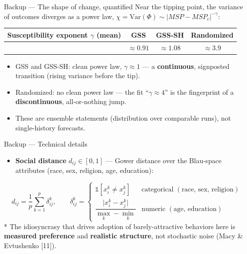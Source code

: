 \documentclass[aspectratio=169,11pt]{beamer}
\newcommand{\refn}[1]{{\color{ndgreen}[#1]}}
\newcommand{\emphr}[1]{{\color{ndreddark}\textbf{#1}}}
\begin{document}
\begin{frame}{Backup — The shape of change, quantified}
\small
Near the tipping point, the variance of outcomes diverges as a power law,
$\chi=\mathrm{Var}(\Phi)\sim|MSP-MSP_c|^{-\gamma}$:
\vspace{0.3cm}
\begin{center}
\renewcommand{\arraystretch}{1.2}
{\normalsize
\begin{tabular}{@{}lccc@{}}
\toprule
Susceptibility exponent $\gamma$ (mean) & \textbf{GSS} & \textbf{GSS-SH} & \textbf{Randomized} \\
\midrule
 & $\approx 0.91$ & $\approx 1.08$ & $\approx 3.9$ \\
\bottomrule
\end{tabular}}
\end{center}
\vspace{0.3cm}
\begin{itemize}
  \item GSS and GSS-SH: clean power law, $\gamma\approx1$ — a \emphr{continuous},
        signposted transition (rising variance before the tip).
  \item Randomized: no clean power law — the fit ``$\gamma\approx4$'' is the
        fingerprint of a \emphr{discontinuous}, all-or-nothing jump.
  \item These are ensemble statements (distribution over comparable runs),
        not single-history forecasts.
\end{itemize}
\end{frame}

\begin{frame}{Backup — Technical details}
\begin{itemize}
  \item \textbf{Social distance} $d_{ij}\in[0,1]$ — Gower distance over the Blau-space
        attributes (race, sex, religion, age, education):
\end{itemize}
\begin{equation*}
  d_{ij} = \frac{1}{p}\sum_{k=1}^{p} \delta_{ij}^{k},
  \qquad
  \delta_{ij}^{k} =
  \begin{cases}
    \mathbb{1}\!\left[x_i^{k}\neq x_j^{k}\right] & \text{categorical } (\text{race, sex, religion})\\[4pt]
    \dfrac{\big|x_i^{k}-x_j^{k}\big|}{\max_k - \min_k} & \text{numeric } (\text{age, education})
  \end{cases}
\end{equation*}
\vspace{0.3cm}
\footnotesize
* The idiosyncrasy that drives adoption of barely-attractive behaviors here is
\emphr{measured preference} and \emphr{realistic structure}, not stochastic noise
(Macy \& Evtushenko \refn{11}).
\end{frame}
\end{document}
